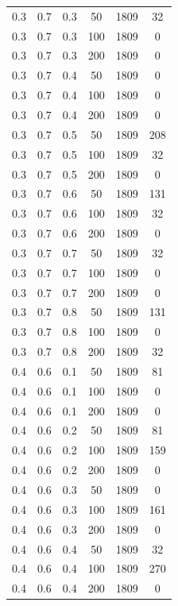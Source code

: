 \documentclass[a4paper,14pt, unknownkeysallowed]{extreport}
\begin{document}
\begin{center}
\begin{longtable}[c]{|c|c|c|c|c|c|}
		0.3 &  0.7 &  0.3 &   50 &  1809 &    32 \\
		0.3 &  0.7 &  0.3 &  100 &  1809 &     0 \\
		0.3 &  0.7 &  0.3 &  200 &  1809 &     0 \\
	   \hline
		0.3 &  0.7 &  0.4 &   50 &  1809 &     0 \\
		0.3 &  0.7 &  0.4 &  100 &  1809 &     0 \\
		0.3 &  0.7 &  0.4 &  200 &  1809 &     0 \\
	   \hline
		0.3 &  0.7 &  0.5 &   50 &  1809 &   208 \\
		0.3 &  0.7 &  0.5 &  100 &  1809 &    32 \\
		0.3 &  0.7 &  0.5 &  200 &  1809 &     0 \\
	   \hline
		0.3 &  0.7 &  0.6 &   50 &  1809 &   131 \\
		0.3 &  0.7 &  0.6 &  100 &  1809 &    32 \\
		0.3 &  0.7 &  0.6 &  200 &  1809 &     0 \\
	   \hline
		0.3 &  0.7 &  0.7 &   50 &  1809 &    32 \\
		0.3 &  0.7 &  0.7 &  100 &  1809 &     0 \\
		0.3 &  0.7 &  0.7 &  200 &  1809 &     0 \\
	   \hline
		0.3 &  0.7 &  0.8 &   50 &  1809 &   131 \\
		0.3 &  0.7 &  0.8 &  100 &  1809 &     0 \\
		0.3 &  0.7 &  0.8 &  200 &  1809 &    32 \\
	   \hline
		0.4 &  0.6 &  0.1 &   50 &  1809 &    81 \\
		0.4 &  0.6 &  0.1 &  100 &  1809 &     0 \\
		0.4 &  0.6 &  0.1 &  200 &  1809 &     0 \\
	   \hline
		0.4 &  0.6 &  0.2 &   50 &  1809 &    81 \\
		0.4 &  0.6 &  0.2 &  100 &  1809 &   159 \\
		0.4 &  0.6 &  0.2 &  200 &  1809 &     0 \\
	   \hline
		0.4 &  0.6 &  0.3 &   50 &  1809 &     0 \\
		0.4 &  0.6 &  0.3 &  100 &  1809 &   161 \\
		0.4 &  0.6 &  0.3 &  200 &  1809 &     0 \\
	   \hline
		0.4 &  0.6 &  0.4 &   50 &  1809 &    32 \\
		0.4 &  0.6 &  0.4 &  100 &  1809 &   270 \\
		0.4 &  0.6 &  0.4 &  200 &  1809 &     0 \\

\end{longtable}
\end{center}
\end{document}

